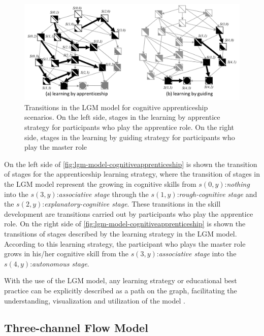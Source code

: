  \begin{figure}[htb]
 \caption[Transitions in the LGM model for cognitive apprenticeship scenarios]{Transitions in the LGM model for cognitive apprenticeship scenarios. On the left side, stages in the learning by apprentice strategy for participants who play the apprentice role. On the right side, stages in the learning by guiding strategy for participants who play the master role}
 \label{fig:lgm-model-cognitiveapprenticeship}
 \centering
 \includegraphics[width=1\textwidth]{images/chap-model-gmif/lgm-model-cognitiveapprenticeship.png}
\end{figure}

On the left side of \autoref{fig:lgm-model-cognitiveapprenticeship} is shown the transition of stages for the apprenticeship learning strategy, where the transition of stages in the LGM model represent the growing in cognitive skills from $s(0,y)$:\emph{nothing} into the $s(3,y)$:\emph{associative stage} through the $s(1,y)$:\emph{rough-cognitive stage} and the $s(2,y)$:\emph{explanatory-cognitive stage}. These transitions in the skill development are transitions carried out by participants who play the apprentice role. On the right side of \autoref{fig:lgm-model-cognitiveapprenticeship} is shown the transitions of stages described by the learning strategy  in the LGM model. According to this learning strategy, the participant who plays the master role grows in his/her cognitive skill from the $s(3,y)$:\emph{associative stage} into the $s(4,y)$:\emph{autonomous stage}.

With the use of the LGM model, any learning strategy or educational best practice can be explicitly described as a path on the graph, facilitating the understanding, visualization and utilization of the model \cite{IsotaniMizoguchiInabaIkeda2010}.

\subsection{Three-channel Flow Model}
\label{subsec:three-channel-flow-model}

